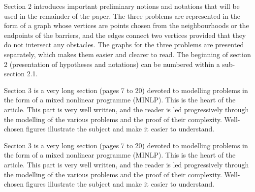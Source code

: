 \documentclass{article}
\newenvironment{reviewer}{\setcounter{pointcounter}{1}}{}
\newcommand{\point}{\text{{\selectfont \thepointcounter} \stepcounter{pointcounter}}}
\begin{document}
\begin{reviewer}
		\begin{tcolorbox}[breakable,enhanced,coltitle=black,colback=green!5!white,colframe=green!75!black,title=\textbf{Answer R2.\point},borderline={1pt}{0pt}{black},boxrule=0pt]

		\end{tcolorbox}
		
		\begin{itshape}
			Section 2 introduces important preliminary notions and notations that will be used in the remainder of the paper. The three problems are represented in the form of a graph whose vertices are points chosen from the neighbourhoods or the endpoints of the barriers, and the edges connect two vertices provided that they do not intersect any obstacles. The graphs for the three problems are presented separately, which makes them easier and clearer to read. The beginning of section 2 (presentation of hypotheses and notations) can be numbered within a sub-section 2.1.
		\end{itshape}
		
		\begin{tcolorbox}[breakable,enhanced,coltitle=black,colback=green!5!white,colframe=green!75!black,title=\textbf{Answer R2.\point},borderline={1pt}{0pt}{black},boxrule=0pt]

		\end{tcolorbox}
		
		\begin{itshape}
			Section 3 is a very long section (pages 7 to 20) devoted to modelling problems in the form of a mixed nonlinear programme (MINLP). This is the heart of the article. This part is very well written, and the reader is led progressively through the modelling of the various problems and the proof of their complexity. Well-chosen figures illustrate the subject and make it easier to understand.
		\end{itshape}
		
		\begin{tcolorbox}[breakable,enhanced,coltitle=black,colback=green!5!white,colframe=green!75!black,title=\textbf{Answer R2.\point},borderline={1pt}{0pt}{black},boxrule=0pt]

		\end{tcolorbox}
		
		\begin{itshape}
			Section 3 is a very long section (pages 7 to 20) devoted to modelling problems in the form of a mixed nonlinear programme (MINLP). This is the heart of the article. This part is very well written, and the reader is led progressively through the modelling of the various problems and the proof of their complexity. Well-chosen figures illustrate the subject and make it easier to understand.
		\end{itshape}
				

\end{reviewer}
\end{document}
